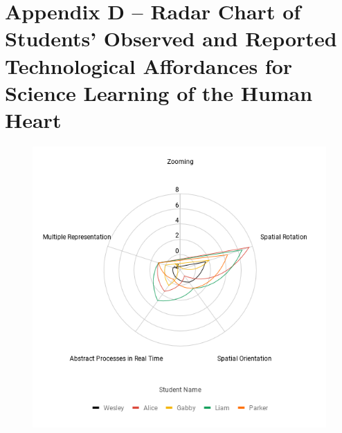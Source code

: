 \documentclass[11.5pt]{sig-alternate} %
\begin{document}
\section*{Appendix D – Radar Chart of Students’ Observed and Reported Technological Affordances for Science Learning of the Human Heart}
 \begin{figure}[!h]
    \centering
    \includegraphics[width=15cm]{Appendix D.png}
\end{figure}
\end{document}

